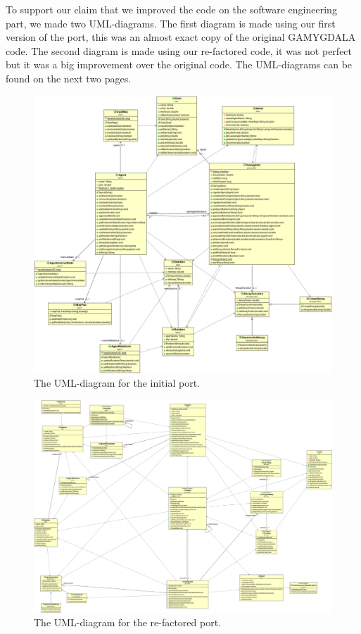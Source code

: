 To support our claim that we improved the code on the software engineering part, we made two UML-diagrams. The first diagram is made using our first version of the port, this was an almost exact copy of the original GAMYGDALA code. The second diagram is made using our re-factored code, it was not perfect but it was a big improvement over the original code. The UML-diagrams can be found on the next two pages.\\

\begin{figure}
\includegraphics[width=\linewidth]{GAMYGDALA_UML_OLD}
\caption{The UML-diagram for the initial port.}
\end{figure}

\begin{figure}
\includegraphics[width=\linewidth]{GAMYGDALA_UML_NEW}
\caption{The UML-diagram for the re-factored port.}
\end{figure}

